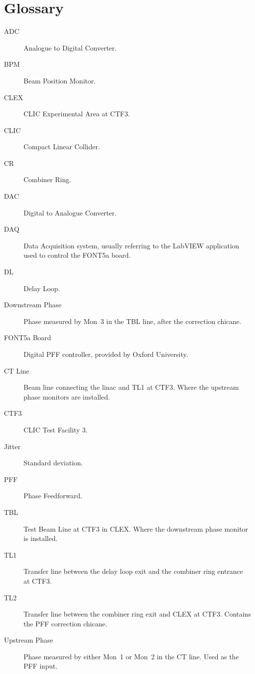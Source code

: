 \cleardoublepage

\chapter*{Glossary}

\pagestyle{plain}

\begin{description}
\item[ADC] Analogue to Digital Converter.
\item[BPM] Beam Position Monitor.
\item[CLEX] CLIC Experimental Area at CTF3.
\item[CLIC] Compact Linear Collider.
\item[CR] Combiner Ring.
\item[DAC] Digital to Analogue Converter.
\item[DAQ] Data Acquisition system, usually referring to the LabVIEW application used to control the FONT5a board.
\item[DL] Delay Loop.
\item[Downstream Phase] Phase measured by Mon~3 in the TBL line, after the correction chicane.
\item[FONT5a Board] Digital PFF controller, provided by Oxford University.
\item[CT Line] Beam line connecting the linac and TL1 at CTF3. Where the upstream phase monitors are installed.
\item[CTF3] CLIC Test Facility 3.
\item[Jitter] Standard deviation.
\item[PFF] Phase Feedforward.
\item[TBL] Test Beam Line at CTF3 in CLEX. Where the downstream phase monitor is installed.
\item[TL1] Transfer line between the delay loop exit and the combiner ring entrance at CTF3.
\item[TL2] Transfer line between the combiner ring exit and CLEX at CTF3. Contains the PFF correction chicane.
\item[Upstream Phase] Phase measured by either Mon~1 or Mon~2 in the CT line. Used as the PFF input.


\end{description}
